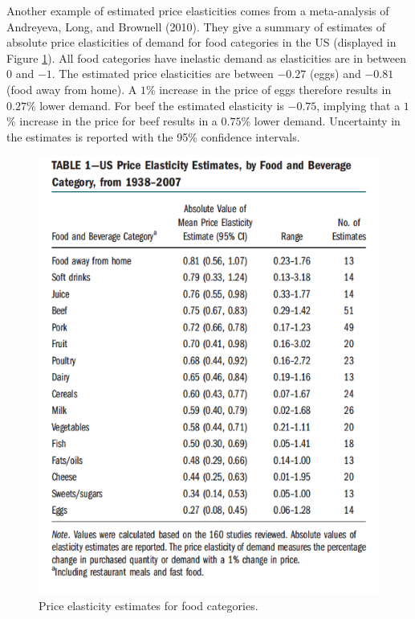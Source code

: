 \documentclass[
]{book}
\begin{document}
Another example of estimated price elasticities comes from a meta-analysis of Andreyeva, Long, and Brownell (2010). They give a summary of estimates of absolute price elasticities of demand for food categories in the US (displayed in Figure \ref{fig:foodelas}). All food categories have inelastic demand as elasticities are in between \(0\) and \(-1\). The estimated price elasticities are between \(-0.27\) (eggs) and \(-0.81\) (food away from home). A \(1\)\% increase in the price of eggs therefore results in \(0.27\)\% lower demand. For beef the estimated elasticity is \(-0.75\), implying that a \(1\)\% increase in the price for beef results in a \(0.75\)\% lower demand. Uncertainty in the estimates is reported with the 95\% confidence intervals.

\begin{figure}
\includegraphics[width=6.83in]{./figures/foodelasticities} \caption{Price elasticity estimates for food categories. }\label{fig:foodelas}
\end{figure}
\end{document}
